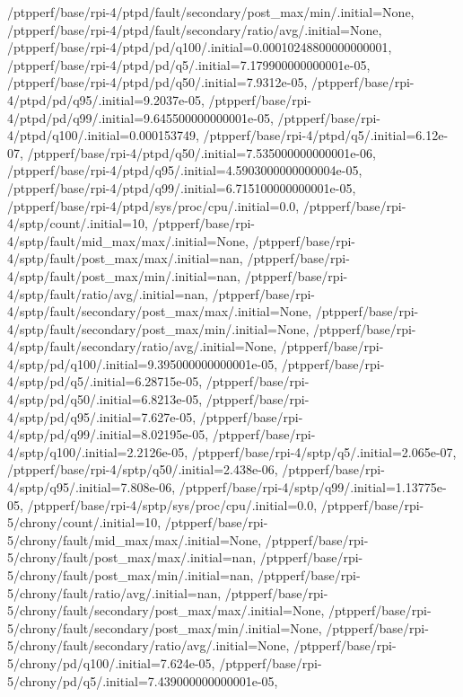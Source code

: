 {    /ptpperf/base/rpi-4/ptpd/fault/secondary/post_max/min/.initial=None,
    /ptpperf/base/rpi-4/ptpd/fault/secondary/ratio/avg/.initial=None,
    /ptpperf/base/rpi-4/ptpd/pd/q100/.initial=0.00010248800000000001,
    /ptpperf/base/rpi-4/ptpd/pd/q5/.initial=7.179900000000001e-05,
    /ptpperf/base/rpi-4/ptpd/pd/q50/.initial=7.9312e-05,
    /ptpperf/base/rpi-4/ptpd/pd/q95/.initial=9.2037e-05,
    /ptpperf/base/rpi-4/ptpd/pd/q99/.initial=9.645500000000001e-05,
    /ptpperf/base/rpi-4/ptpd/q100/.initial=0.000153749,
    /ptpperf/base/rpi-4/ptpd/q5/.initial=6.12e-07,
    /ptpperf/base/rpi-4/ptpd/q50/.initial=7.535000000000001e-06,
    /ptpperf/base/rpi-4/ptpd/q95/.initial=4.5903000000000004e-05,
    /ptpperf/base/rpi-4/ptpd/q99/.initial=6.715100000000001e-05,
    /ptpperf/base/rpi-4/ptpd/sys/proc/cpu/.initial=0.0,
    /ptpperf/base/rpi-4/sptp/count/.initial=10,
    /ptpperf/base/rpi-4/sptp/fault/mid_max/max/.initial=None,
    /ptpperf/base/rpi-4/sptp/fault/post_max/max/.initial=nan,
    /ptpperf/base/rpi-4/sptp/fault/post_max/min/.initial=nan,
    /ptpperf/base/rpi-4/sptp/fault/ratio/avg/.initial=nan,
    /ptpperf/base/rpi-4/sptp/fault/secondary/post_max/max/.initial=None,
    /ptpperf/base/rpi-4/sptp/fault/secondary/post_max/min/.initial=None,
    /ptpperf/base/rpi-4/sptp/fault/secondary/ratio/avg/.initial=None,
    /ptpperf/base/rpi-4/sptp/pd/q100/.initial=9.395000000000001e-05,
    /ptpperf/base/rpi-4/sptp/pd/q5/.initial=6.28715e-05,
    /ptpperf/base/rpi-4/sptp/pd/q50/.initial=6.8213e-05,
    /ptpperf/base/rpi-4/sptp/pd/q95/.initial=7.627e-05,
    /ptpperf/base/rpi-4/sptp/pd/q99/.initial=8.02195e-05,
    /ptpperf/base/rpi-4/sptp/q100/.initial=2.2126e-05,
    /ptpperf/base/rpi-4/sptp/q5/.initial=2.065e-07,
    /ptpperf/base/rpi-4/sptp/q50/.initial=2.438e-06,
    /ptpperf/base/rpi-4/sptp/q95/.initial=7.808e-06,
    /ptpperf/base/rpi-4/sptp/q99/.initial=1.13775e-05,
    /ptpperf/base/rpi-4/sptp/sys/proc/cpu/.initial=0.0,
    /ptpperf/base/rpi-5/chrony/count/.initial=10,
    /ptpperf/base/rpi-5/chrony/fault/mid_max/max/.initial=None,
    /ptpperf/base/rpi-5/chrony/fault/post_max/max/.initial=nan,
    /ptpperf/base/rpi-5/chrony/fault/post_max/min/.initial=nan,
    /ptpperf/base/rpi-5/chrony/fault/ratio/avg/.initial=nan,
    /ptpperf/base/rpi-5/chrony/fault/secondary/post_max/max/.initial=None,
    /ptpperf/base/rpi-5/chrony/fault/secondary/post_max/min/.initial=None,
    /ptpperf/base/rpi-5/chrony/fault/secondary/ratio/avg/.initial=None,
    /ptpperf/base/rpi-5/chrony/pd/q100/.initial=7.624e-05,
    /ptpperf/base/rpi-5/chrony/pd/q5/.initial=7.439000000000001e-05,
}
